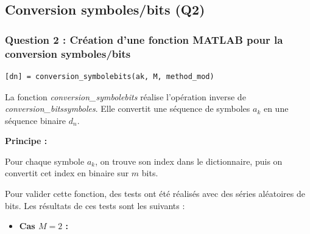 \documentclass[12pt,a4paper]{article}
\begin{document}
\subsection{Conversion symboles/bits (Q2)}

\subsubsection{Question 2 : Création d'une fonction MATLAB pour la conversion symboles/bits}

\begin{lstlisting}
[dn] = conversion_symbolebits(ak, M, method_mod)
\end{lstlisting}

La fonction \textit{conversion\_symbolebits} réalise l'opération inverse de \textit{conversion\_bitssymboles}. Elle convertit une séquence de symboles $a_k$ en une séquence binaire $d_n$.

\textbf{Principe :}

Pour chaque symbole $a_k$, on trouve son index dans le dictionnaire, puis on convertit cet index en binaire sur $m$ bits.

\begin{center}
\end{center}

\begin{center}
\end{center}

Pour valider cette fonction, des tests ont été réalisés avec des séries aléatoires de bits. Les résultats de ces tests sont les suivants :

\begin{itemize}
    \item \textbf{Cas $M = 2$ :}
\end{itemize}
\end{document}
